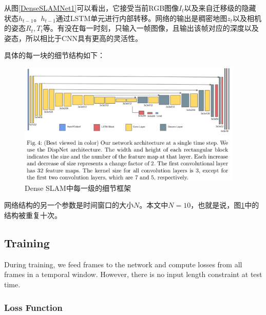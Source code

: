 从图\ref{DenseSLAMNet1}可以看出，它接受当前RGB图像$I_t$以及来自迁移级的隐藏状态$h_{t-1}$。$h_{t-1}$通过LSTM单元进行内部转移。网络的输出是稠密地图$z_t$以及相机的姿态$R_t, T_t$等。有没在每一时刻，只输入一帧图像，且输出该帧对应的深度以及姿态，所以相比于CNN具有更高的灵活性。

具体的每一块的细节结构如下：

\begin{figure}[!htbp]
\centering
\includegraphics[width=0.95\textwidth]{SemanticSLAM/DenseSLAMNet2.png}
\caption{Dense SLAM中每一级的细节框架}
\label{DenseSLAMNet2}
\end{figure}

网络结构的另一个参数是时间窗口的大小$N$。本文中$N=10$，也就是说，图\ref{DenseSLAMNet2}中的结构被重复十次。

\subsection{Training}

During training, we feed
frames to the network and compute losses from all frames in a temporal window. However, there is no input length constraint at test time.

\subsubsection{Loss Function}

